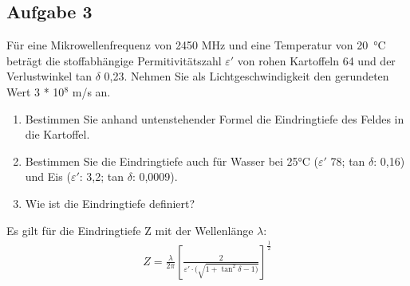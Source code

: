 \documentclass[a4paper,11pt]{article}
\newif\ifshowme
\begin{document}
\pagebreak
\subsection*{Aufgabe 3}
Für eine Mikrowellenfrequenz von 2450 MHz und eine Temperatur von \mbox{20 °C} beträgt die
stoffabhängige Permitivitätszahl $\varepsilon '$ von rohen Kartoffeln 64 und der Verlustwinkel tan $\delta$ 0,23.
Nehmen Sie als Lichtgeschwindigkeit den gerundeten Wert 3 * 10$^8$ m/s an.
\begin{enumerate}[label=\alph*)]

\item Bestimmen Sie anhand untenstehender Formel die Eindringtiefe des Feldes in die
Kartoffel.
\item Bestimmen Sie die Eindringtiefe auch für Wasser bei 25°C ($\varepsilon '$ 78; tan $\delta$: 0,16) und Eis
($\varepsilon '$: 3,2; tan $\delta$: 0,0009).
\item Wie ist die Eindringtiefe definiert?

\end{enumerate}
Es gilt für die Eindringtiefe Z mit der Wellenlänge $\lambda$: 
\begin{align*}
Z = \frac{\lambda}{2 \pi} \left[ \frac{2}{\varepsilon ' \cdot (\sqrt{1+ \tan^2 \delta - 1)}} \right]^{\frac{1}{2}}
\end{align*}

\ppbig 


\ifshowme
\antwort{
Für das Lösen der oben stehenden Aufgaben müssen wir zunächst die Wellenlänge $\lambda$ ausrechnen:


\begin{align*}
\lambda = \frac{c}{f} \qquad \rightarrow \qquad \frac{3 \cdot 10^8 ~\text{m/s}}{2.450 \cdot 10^6 ~\text{Hz}} = 0,1224 ~\text{m}
\end{align*}

\marginnote[]{Vorsicht beim Einsetzen von tan $\delta$. Die Formel ist einwenig verwirrend.}[1cm]
Dann Werte einsetzen (Kartoffel): 

\begin{align*}
Z &= \frac{0,1224 ~\text{m}}{2 \pi} \left[ \frac{2}{64 \cdot (\sqrt{1+ (0,23)^2 - 1)}} \right]^{\frac{1}{2}} \\
 &= 0,0213 ~\text{m}
\end{align*}

Das Selbe für Wasser: 

\begin{align*}
Z &= \frac{0,1224 ~\text{m}}{2 \pi} \left[ \frac{2}{78 \cdot (\sqrt{1+ (0,16)^2 - 1)}} \right]^{\frac{1}{2}} \\
 &= 0,0276 ~\text{m}
\end{align*}


Und Eis:

\begin{align*}
Z &= \frac{0,1224 ~\text{m}}{2 \pi} \left[ \frac{2}{2,3 \cdot (\sqrt{1+ (0,0009)^2 - 1)}} \right]^{\frac{1}{2}} \\
 &= 24,2 ~\text{m}
\end{align*}


}
\else
\fi




\ifshowme
\antwort{
\textbf{Eindringtiefe Z:} \par Punkt, an dem die elektrische Feldstärke nur noch 1/e von der ursprünglichen Feldstärke entspricht.

}
\else
\fi
\end{document}
